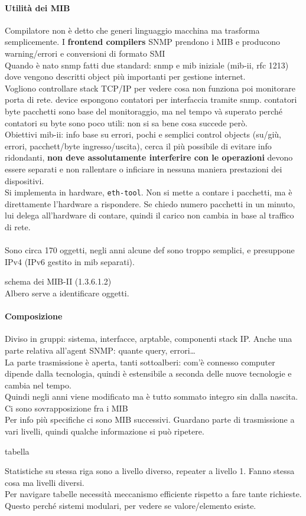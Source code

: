 \documentclass[10pt]{book}
\begin{document}
\paragraph{Utilità dei MIB} Compilatore non è detto che generi linguaggio macchina ma trasforma semplicemente. I \textbf{frontend compilers} SNMP prendono i MIB e producono warning/errori e conversioni di formato SMI\\
Quando è nato snmp fatti due standard: snmp e mib iniziale (mib-ii, rfc 1213) dove vengono descritti object più importanti per gestione internet.\\
Vogliono controllare stack TCP/IP per vedere cosa non funziona poi monitorare porta di rete. device espongono contatori per interfaccia tramite snmp. contatori byte pacchetti sono base del monitoraggio, ma nel tempo và superato perché contatori su byte sono poco utili: non si sa bene cosa succede però. \\
Obiettivi mib-ii: info base su errori, pochi e semplici control objects (su/giù, errori, pacchett/byte ingresso/uscita), cerca il più possibile di evitare info ridondanti, \textbf{non deve assolutamente interferire con le operazioni} devono essere separati e non rallentare o inficiare in nessuna maniera prestazioni dei dispositivi.\\
Si implementa in hardware, \texttt{eth-tool}. Non si mette a contare i pacchetti, ma è direttamente l'hardware a rispondere. Se chiedo numero pacchetti in un minuto, lui delega all'hardware di contare, quindi il carico non cambia in base al traffico di rete.\\\\
Sono circa 170 oggetti, negli anni alcune def sono troppo semplici, e presuppone IPv4 (IPv6 gestito in mib separati).
\begin{center}
	schema dei MIB-II (1.3.6.1.2)\\
	Albero serve a identificare oggetti.
\end{center}
\paragraph{Composizione} Diviso in gruppi: sistema, interfacce, arptable, componenti stack IP. Anche una parte relativa all'agent SNMP: quante query, errori\ldots\\
La parte trasmissione è aperta, tanti sottoalberi: com'è connesso computer dipende dalla tecnologia, quindi è estensibile a seconda delle nuove tecnologie e cambia nel tempo.\\
Quindi negli anni viene modificato ma è tutto sommato integro sin dalla nascita. Ci sono sovrapposizione fra i MIB\\
Per info più specifiche ci sono MIB successivi. Guardano parte di trasmissione a vari livelli, quindi qualche informazione si può ripetere.
\begin{center}
	tabella
\end{center}
Statistiche su stessa riga sono a livello diverso, repeater a livello 1. Fanno stessa cosa ma livelli diversi.\\
Per navigare tabelle necessità meccanismo efficiente rispetto a fare tante richieste. Questo perché sistemi modulari, per vedere se valore/elemento esiste.
\end{document}
